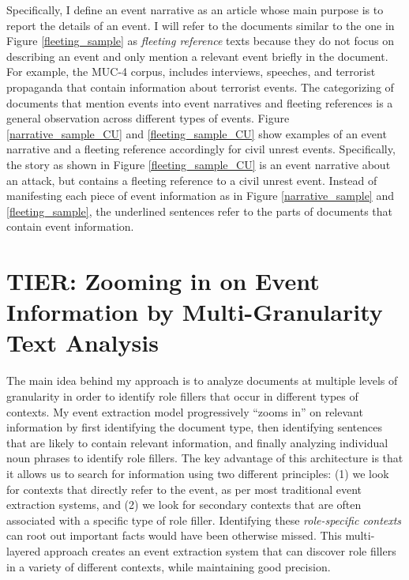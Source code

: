 Specifically, I define an event
narrative as an article whose main purpose is to report the details
of an event.
I will refer to the documents similar to the one in 
Figure \ref{fleeting_sample} as {\it
fleeting reference} texts because they do not focus on describing 
an event and only mention a relevant event
briefly in the document. 
For example, 
the MUC-4 
corpus, includes interviews, speeches, and terrorist
propaganda that contain information about terrorist events. 
The categorizing of documents that mention events into event narratives 
and fleeting references is a general observation across different types of 
events. Figure \ref{narrative_sample_CU} and \ref{fleeting_sample_CU} 
show examples of an event narrative and a fleeting reference accordingly 
for civil unrest events. Specifically, the story 
as shown in Figure \ref{fleeting_sample_CU} is an event narrative 
about an attack, but contains a fleeting reference to a civil unrest event. 
Instead of manifesting each piece of event 
information as in Figure \ref{narrative_sample} and \ref{fleeting_sample}, 
the underlined sentences refer to the parts of documents that contain 
event information.



\section{TIER: Zooming in on Event Information by Multi-Granularity Text Analysis}
\label{TIER}
The main idea behind my approach is to analyze documents at multiple
levels of granularity in order to identify role fillers that occur in
different types of contexts. My event extraction model progressively
``zooms in'' on relevant information by first identifying the document
type, then identifying sentences that are likely to contain relevant
information, and finally analyzing individual noun phrases to identify
role fillers. The key advantage of this architecture is that it allows
us to search for information using two different principles: (1) we
look for contexts that directly refer to the event, as per most
traditional event extraction systems, and (2) we look for secondary
contexts that are often associated with a specific type of role
filler. Identifying these {\it role-specific contexts} can root out
important facts would have been otherwise missed. This multi-layered
approach creates an event extraction system that can discover role
fillers in a variety of different contexts, while maintaining good
precision. 

